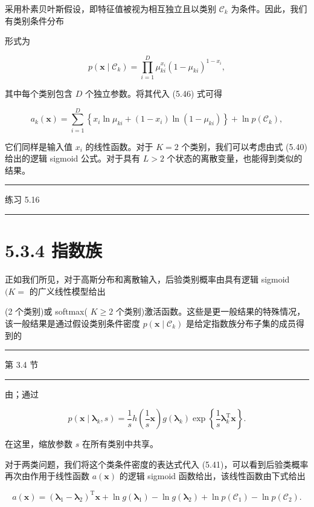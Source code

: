 \documentclass[10pt]{report}
\newcommand{\HRule}{\begin{center}\rule{0.9\linewidth}{0.2mm}\end{center}}
\begin{document}
采用朴素贝叶斯假设，即特征值被视为相互独立且以类别 \({\mathcal{C}}_{k}\) 为条件。因此，我们有类别条件分布

形式为

\[
p\left( {\mathbf{x} \mid  {\mathcal{C}}_{k}}\right)  = \mathop{\prod }\limits_{{i = 1}}^{D}{\mu }_{ki}^{{x}_{i}}{\left( 1 - {\mu }_{ki}\right) }^{1 - {x}_{i}}, \tag{5.64}
\]

其中每个类别包含 \(D\) 个独立参数。将其代入 (5.46) 式可得

\[
{a}_{k}\left( \mathbf{x}\right)  = \mathop{\sum }\limits_{{i = 1}}^{D}\left\{  {{x}_{i}\ln {\mu }_{ki} + \left( {1 - {x}_{i}}\right) \ln \left( {1 - {\mu }_{ki}}\right) }\right\}   + \ln p\left( {\mathcal{C}}_{k}\right) , \tag{5.65}
\]

它们同样是输入值 \({x}_{i}\) 的线性函数。对于 \(K = 2\) 个类别，我们可以考虑由式 (5.40) 给出的逻辑 sigmoid 公式。对于具有 \(L > 2\) 个状态的离散变量，也能得到类似的结果。

\HRule

练习 5.16

\HRule

\section*{5.3.4 指数族}

正如我们所见，对于高斯分布和离散输入，后验类别概率由具有逻辑 sigmoid \((K =\) 的广义线性模型给出

(2 个类别)或 softmax( \(K \geq  2\) 个类别)激活函数。这些是更一般结果的特殊情况，该一般结果是通过假设类别条件密度 \(p\left( {\mathbf{x} \mid  {\mathcal{C}}_{k}}\right)\) 是给定指数族分布子集的成员得到的

\HRule

第 3.4 节

\HRule

由；通过

\[
p\left( {\mathbf{x} \mid  {\mathbf{\lambda }}_{k},s}\right)  = \frac{1}{s}h\left( {\frac{1}{s}\mathbf{x}}\right) g\left( {\mathbf{\lambda }}_{k}\right) \exp \left\{  {\frac{1}{s}{\mathbf{\lambda }}_{k}^{\mathrm{T}}\mathbf{x}}\right\}  . \tag{5.66}
\]

在这里，缩放参数 \(s\) 在所有类别中共享。

对于两类问题，我们将这个类条件密度的表达式代入 (5.41)，可以看到后验类概率再次由作用于线性函数 \(a\left( \mathbf{x}\right)\) 的逻辑 sigmoid 函数给出，该线性函数由下式给出

\[
a\left( \mathbf{x}\right)  = {\left( {\mathbf{\lambda }}_{1} - {\mathbf{\lambda }}_{2}\right) }^{\mathrm{T}}\mathbf{x} + \ln g\left( {\mathbf{\lambda }}_{1}\right)  - \ln g\left( {\mathbf{\lambda }}_{2}\right)  + \ln p\left( {\mathcal{C}}_{1}\right)  - \ln p\left( {\mathcal{C}}_{2}\right) . \tag{5.67}
\]
\end{document}

